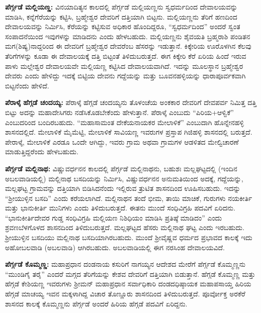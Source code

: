 \textbf{ಪೆರ್ಗ್ಗಡೆ ಮಲ್ಲಿಯಣ್ಣ:} ವಿನಯಾದಿತ್ಯನ ಕಾಲದಲ್ಲಿ ಪೆರ್ಗ್ಗಡೆ ಮಲ್ಲಿಯಣ್ಣನು ಸ್ವಧರ್ಮದಿಂದ ದೇವಾಲಯವನ್ನು ಮಾಡಿಸಿ, ಕನ್ನೆಗೆರೆಯನ್ನು ಕಟ್ಟಿಸಿ, ಬ್ರಹ್ಮೇಶ್ವರ ದೇವರಿಗೆ ದತ್ತಿಯಾಗಿ ಬಿಟ್ಟನು. ಮಲ್ಲಿಯಣ್ಣನು ತೆರಿಗೆ ಹಣದಿಂದ ದೇವಾಲಯವನ್ನು ನಿರ್ಮಿಸಿ, ಕೆರೆಯನ್ನು ಕಟ್ಟಿಸುವ ಅಧಿಕಾರ ಹೊಂದಿದ್ದರೂ, “ಸ್ವಧರ್ಮದಿಂದ” ಅಂದರೆ ಸ್ವಂತ ಸಂಪಾದನೆ\-ಯಿಂದ ಇವುಗಳನ್ನು ಮಾಡಿದನು ಎಂದು ಹೇಳಬಹುದು. ಮಲ್ಲಿಯಣ್ಣನು ಶೈವಯತಿ ಬ್ರಹ್ಮರಾಶಿ ಪಂಡಿತನ ಮಗ(ಶಿಷ್ಯ)\-ನಾದ್ದರಿಂದ ಈ ದೇವರಿಗೆ ಬ್ರಹ್ಮೇಶ್ವರ ದೇವರೆಂಬ ಹೆಸರನ್ನು ಇಡುತ್ತಾನೆ. ಕಿಕ್ಕೇರಿಯ ಊರೊಳಗಿನ ಕೆಲವು ತೆರಿಗೆಗಳನ್ನು ಕೂಡಾ ಈ ದೇವಾಲಯಕ್ಕೆ ದತ್ತಿ ಬಿಟ್ಟಂತೆ ತಿಳಿದುಬರುತ್ತದೆ. ಈಗ ಕಿಕ್ಕೇರಿ ಕೆರೆ ಏರಿಯ ಹಿಂದೆ ಇರುವ ಪಾಳು ಮಲ್ಲೇಶ್ವರ ದೇವಾಲಯವೇ ಮಲ್ಲಿಯಣ್ಣ ಕಟ್ಟಿಸಿದ ದೇವಾಲಯವಾಗಿದೆ. ಇದನ್ನು ಮೂಲಸ್ಥಾನ ಬ್ರಹ್ಮೇಶ್ವರ ದೇವರು ಎಂದು ಹೇಳಿದ್ದು ಇದಕ್ಕೆ ಬಿಟ್ಟಿಯ ದೇವನು ಗದ್ದೆಯನ್ನು ಮತ್ತು ಬೂವನಹಳ್ಳಿಯನ್ನು ಧಾರಾಪೂರ್ವಕವಾಗಿ ಬಿಟ್ಟನೆಂದು ಹೇಳಿದೆ.

\textbf{ಪೆರಾಳ್ಕೆ ಹೆಗ್ಗಡೆ ಚಂದಯ್ಯ:} ಪೆರಾಳ್ಕೆ ಹೆಗ್ಗಡೆ ಚಂದಯ್ಯನು ತೊಳಂಚೆಯ ಅಂಕಕಾರ ದೇವರಿಗೆ ದೇವಪರ್ವ ನಿಮಿತ್ತ ದತ್ತಿ ಬಿಟ್ಟು ಅದನ್ನು ಮಹಾದೇಸಿಗರು ನಡೆಸಿಕೊಡಬೇಕೆಂದು ಹೇಳುತ್ತಾನೆ. ಪೆರಾಳ್ಕೆ ಎಂಬುದು “ಪಿರಿಯ+ಆಳ್ವಿಕೆ” ಎಂಬುದರಿಂದ ಬಂದಿರಬಹುದು. “ಮಹಾಸಾಮಂತ ದೇಕೆಯನಾಯಕರ ಮೇಲಾಳಿಕೆ” ಎಂಬುದಾಗಿ ಹೊನ್ನೇನಹಳ್ಳಿ ಶಾಸನದಲ್ಲಿದೆ. ಮೇಲಾಳಿಕೆ ಮೈಮೆಟ್ಟಿ, ಮೇಲಾಳಿಕೆ ಸಾವಿಯಣ್ಣ ಇವರುಗಳ ಪ್ರಸ್ತಾಪ ಗಿಜಿಹಳ್ಳಿ ಶಾಸನದಲ್ಲಿ ಬರುತ್ತದೆ. ಪೇರಾಳ್ಕೆ, ಮೇಲಾಳಿಕೆ ಎರಡೂ ಒಂದೇ ಆಗಿದ್ದು, ಇವರು ಗ್ರಾಮ ಅಥವಾ ಗ್ರಾಮಗಳ ಆಡಳಿತದ ಮೇಲ್ವಿಚಾರಣೆ ಮಾಡುತ್ತಿದ್ದರೆಂದು ಹೇಳಬಹುದು.

\textbf{ಪೆರ್ಗ್ಗಡೆ ಮಲ್ಲಿನಾಥ:} ವಿಷ್ಣುವರ್ಧನನ ಕಾಲದಲ್ಲಿ ಪೆರ್ಗ್ಗಡೆ ಮಲ್ಲಿನಾಥನು, ಬಹುಶಃ ಮಲ್ಲಘಟ್ಟದಲ್ಲಿ (ಇಂದಿನ ಅಬಲವಾಡಿಯಲ್ಲಿ) ಮಲ್ಲಿನಾಥ ಬಸದಿಯನ್ನು ನಿರ್ಮಿಸಿ, ವಿಷ್ಣುವರ್ಧನನ ಅನುಮತಿಯಿಂದ ಅದಕ್ಕೆ, ಗದ್ದೆಯನ್ನು, ಮಲ್ಲಘಟ್ಟ ಗ್ರಾಮವನ್ನು ದತ್ತಿಯಾಗಿ ಬಿಡಿಸಿದನೆಂದು ಇಲ್ಲಿರುವ ತ್ರುಟಿತ ಶಾಸನದಿಂದ ಊಹಿಸಬಹುದು. ಇದನ್ನು “ಶ‍್ರೀಯುಳ್ಳಿನ ಬಸದಿ” ಎಂದು ಕರೆಯಲಾಗಿದೆ. ಮಲ್ಲಿನಾಥನ ತಂದೆ ಭೀಮ, ತಾಯಿ ಮಾಚಿಕೆ, ಗುರುಗಳು ನಯಕೀರ್ತಿ ಮತ್ತು ಭಾನುಕೀರ್ತಿ ಮುನಿಗಳು ಎಂದು ತಿಳಿದುಬರುತ್ತದೆ. ಈತನು ಮುಂದೆ ಸಂಧಿವಿಗ್ರಹಿ ಪದವಿಗೆ ಏರಿದನು. “ಭಾನುಕೀರ್ತಿದೇವರ ಗುಡ್ಡ ಸಂಧಿವಿಗ್ರಹಿ ಮಲ್ಲಿಯಣ ನಿಶಿಧಿಯಂ ಮಾಡಿಸಿ ಪ್ರತಿಷ್ಠೆ ಮಾಡಿದಂ” ಎಂದು ಶ್ರವಣಬೆಳಗೊಳದ ಶಾಸನದಿಂದ ತಿಳಿದುಬರುತ್ತದೆ. ಮಲ್ಲಘಟ್ಟದ ಹೆಸರು ಮಲ್ಲಿನಾಥ ಘಟ್ಟ ಎಂದು ಇರಬಹುದು. ಶ‍್ರೀಯುಳ್ಳಿನ ಬಸದಿಯು ಮಲ್ಲಿನಾಥ ಬಸದಿಯಾಗಿರಬಹುದು. ಮುಂದೆ ಶ‍್ರೀವೈಷ್ಣವ ಧರ್ಮದ ಪ್ರಭಾವದ ಕಾಲಕ್ಕೆ ಇದು ಅಹೋಬಲವಾಡಿ (ಅಬಲವಾಡಿ) ಆಗಿರಬಹುದು. ಅಬಲವಾಡಿಯಲ್ಲಿ ಈಗ ನರಸಿಂಹ ದೇವಾಲಯವಿದೆ.

\textbf{ಪೆರ್ಗ್ಗಡೆ ಕೊಮ್ಮಣ್ಣ:} ಮಹಾಪ್ರಧಾನ ದಂಡನಾಯ ಕಸುರಿಗೆ ನಾಗಯ್ಯನ ಆದೇಶದ ಮೇರೆಗೆ ಪೆರ್ಗ್ಗಡೆ ಕೊಮ್ಮಣ್ಣನು “ಮುಂಡಿಗೈ ತರೈ” ಎಂದರೆ ಮಗ್ಗದ ತೆರಿಗೆಯನ್ನು ಕೇಶವ ದೇವರಿಗೆ ದತ್ತಿಯಾಗಿ ಬಿಡುತ್ತಾನೆ. ಹೆಗ್ಗಡೆ ಕೊಮ್ಮಣ್ಣ ಮತ್ತು ಹೆಗ್ಗಡೆ ಕೇಶಿಯಣ್ಣ ಇವರುಗಳು ಶ‍್ರೀಮನ್​ ಮಹಾಪ್ರಧಾನ ಸರ್ವಾಧಿಕಾರಿ ದಂಡದಧಿಷ್ಠಾಯಕ ಮಹಾಪಸಾಯ್ತ ಹಿರಿಯ ಹೆಗ್ಗಡೆ ಮಾಚಯ್ಯ ಇವನ ಮಕ್ಕಳಾಗಿದ್ದ ವಿಚಾರ ತೊಣ್ಣೂರು ಶಾಸನದಿಂದ ತಿಳಿದುಬರುತ್ತದೆ. ಪೂರ್ವೋಕ್ತ ಅರಕೆರೆ ಶಾಸನದ ಕಾಲಕ್ಕೆ ಕೊಮ್ಮಣ್ಣನು ಪೆರ್ಗ್ಗಡೆ ಅಂದರೆ ಹಿರಿಯ ಹೆಗ್ಗಡೆ ಪದವಿಗೆ ಏರಿದ್ದನು.

